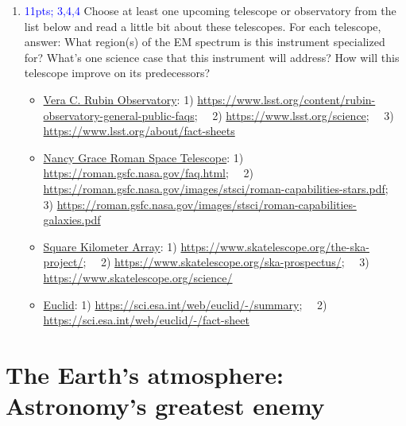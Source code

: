 \documentclass[11pt]{article}
\begin{document}
\begin{enumerate}
    
    \item \textcolor{blue}{11pts; 3,4,4} Choose at least one upcoming telescope or observatory from the list below and read a little bit about these telescopes. For each telescope, answer: What region(s) of the EM spectrum is this instrument specialized for? What's one science case that this instrument will address? How will this telescope improve on its predecessors?
    \begin{itemize}
        \item \underline{Vera C. Rubin Observatory}: 1) \url{https://www.lsst.org/content/rubin-observatory-general-public-faqs}; \, \, 2) \url{https://www.lsst.org/science}; \, \, 3) \url{https://www.lsst.org/about/fact-sheets}
        
        \item \underline{Nancy Grace Roman Space Telescope}: 1) \url{https://roman.gsfc.nasa.gov/faq.html}; \, \, 2) \url{https://roman.gsfc.nasa.gov/images/stsci/roman-capabilities-stars.pdf}; \, \, 3) \url{https://roman.gsfc.nasa.gov/images/stsci/roman-capabilities-galaxies.pdf}
        
        \item \underline{Square Kilometer Array}: 1) \url{https://www.skatelescope.org/the-ska-project/}; \, \, 2) \url{https://www.skatelescope.org/ska-prospectus/}; \, \, 3) \url{https://www.skatelescope.org/science/}
        
        \item \underline{Euclid}: 1) \url{https://sci.esa.int/web/euclid/-/summary}; \, \, 2) \url{https://sci.esa.int/web/euclid/-/fact-sheet}
    \end{itemize}
    
\end{enumerate}

\section{The Earth's atmosphere: Astronomy's greatest enemy}
\end{document}
